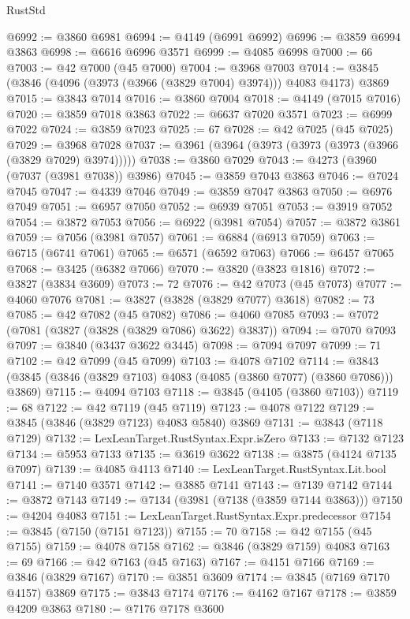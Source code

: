 \begin{lexlean}{RustStd}
\begin{coremodule}
@6992 := @3860 @6981
@6994 := @4149 (@6991 @6992)
@6996 := @3859 @6994 @3863
@6998 := @6616 @6996 @3571
@6999 := @4085 @6998
@7000 := 66
@7003 := @42 @7000 (@45 @7000)
@7004 := @3968 @7003
@7014 := @3845 (@3846 (@4096 (@3973 (@3966 (@3829 @7004) @3974))) @4083 @4173) @3869
@7015 := @3843 @7014
@7016 := @3860 @7004
@7018 := @4149 (@7015 @7016)
@7020 := @3859 @7018 @3863
@7022 := @6637 @7020 @3571
@7023 := @6999 @7022
@7024 := @3859 @7023
@7025 := 67
@7028 := @42 @7025 (@45 @7025)
@7029 := @3968 @7028
@7037 := @3961 (@3964 (@3973 (@3973 (@3973 (@3966 (@3829 @7029) @3974)))))
@7038 := @3860 @7029
@7043 := @4273 (@3960 (@7037 (@3981 @7038)) @3986)
@7045 := @3859 @7043 @3863
@7046 := @7024 @7045
@7047 := @4339 @7046
@7049 := @3859 @7047 @3863
@7050 := @6976 @7049
@7051 := @6957 @7050
@7052 := @6939 @7051
@7053 := @3919 @7052
@7054 := @3872 @7053
@7056 := @6922 (@3981 @7054)
@7057 := @3872 @3861
@7059 := @7056 (@3981 @7057)
@7061 := @6884 (@6913 @7059)
@7063 := @6715 (@6741 @7061)
@7065 := @6571 (@6592 @7063)
@7066 := @6457 @7065
@7068 := @3425 (@6382 @7066)
@7070 := @3820 (@3823 @1816)
@7072 := @3827 (@3834 @3609)
@7073 := 72
@7076 := @42 @7073 (@45 @7073)
@7077 := @4060 @7076
@7081 := @3827 (@3828 (@3829 @7077) @3618)
@7082 := 73
@7085 := @42 @7082 (@45 @7082)
@7086 := @4060 @7085
@7093 := @7072 (@7081 (@3827 (@3828 (@3829 @7086) @3622) @3837))
@7094 := @7070 @7093
@7097 := @3840 (@3437 @3622 @3445)
@7098 := @7094 @7097
@7099 := 71
@7102 := @42 @7099 (@45 @7099)
@7103 := @4078 @7102
@7114 := @3843 (@3845 (@3846 (@3829 @7103) @4083 (@4085 (@3860 @7077) (@3860 @7086))) @3869)
@7115 := @4094 @7103
@7118 := @3845 (@4105 (@3860 @7103))
@7119 := 68
@7122 := @42 @7119 (@45 @7119)
@7123 := @4078 @7122
@7129 := @3845 (@3846 (@3829 @7123) @4083 @5840) @3869
@7131 := @3843 (@7118 @7129)
@7132 := LexLeanTarget.RustSyntax.Expr.isZero
@7133 := @7132 @7123
@7134 := @5953 @7133
@7135 := @3619 @3622
@7138 := @3875 (@4124 @7135 @7097)
@7139 := @4085 @4113
@7140 := LexLeanTarget.RustSyntax.Lit.bool
@7141 := @7140 @3571
@7142 := @3885 @7141
@7143 := @7139 @7142
@7144 := @3872 @7143
@7149 := @7134 (@3981 (@7138 (@3859 @7144 @3863)))
@7150 := @4204 @4083
@7151 := LexLeanTarget.RustSyntax.Expr.predecessor
@7154 := @3845 (@7150 (@7151 @7123))
@7155 := 70
@7158 := @42 @7155 (@45 @7155)
@7159 := @4078 @7158
@7162 := @3846 (@3829 @7159) @4083
@7163 := 69
@7166 := @42 @7163 (@45 @7163)
@7167 := @4151 @7166
@7169 := @3846 (@3829 @7167)
@7170 := @3851 @3609
@7174 := @3845 (@7169 @7170 @4157) @3869
@7175 := @3843 @7174
@7176 := @4162 @7167
@7178 := @3859 @4209 @3863
@7180 := @7176 @7178 @3600

\end{coremodule}
\end{lexlean}
